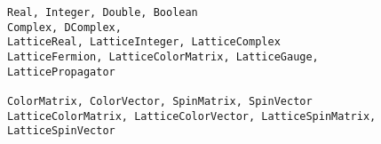 \documentclass[12pt,letterpaper]{article}
\begin{document}
\begin{verbatim}
Real, Integer, Double, Boolean
Complex, DComplex,
LatticeReal, LatticeInteger, LatticeComplex
LatticeFermion, LatticeColorMatrix, LatticeGauge,
LatticePropagator

ColorMatrix, ColorVector, SpinMatrix, SpinVector
LatticeColorMatrix, LatticeColorVector, LatticeSpinMatrix, LatticeSpinVector
\end{verbatim}
\end{document}
